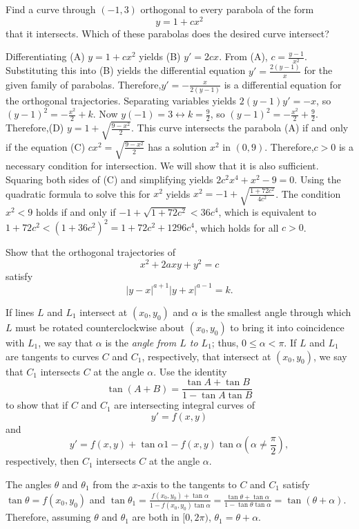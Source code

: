 \documentclass{ximera}
\begin{document}
\begin{problem}\label{exer:4.5.30}
Find a curve through $(-1,3)$ orthogonal to every parabola of the form
$$
y=1+cx^2
$$
that it intersects. Which of these parabolas does the desired curve
intersect?

\begin{solution}
Differentiating (A) $y=1+cx^2$ yields (B) $y'=2cx$. From (A),
$c=\frac{y-1}{x^2}$. Substituting this into (B) yields the
differential equation $y'=\frac{2(y-1)}{x}$ for the given family of
parabolas. Therefore,$y'=-\frac{x}{2(y-1)}$ is a differential
equation for the orthogonal trajectories. Separating variables yields
$2(y-1)y'=-x$, so $(y-1)^2=-\frac{x^2}{2}+k$. Now
$y(-1)=3\leftrightarrow k=\frac{9}{2}$, so
$(y-1)^2=-\frac{x^2}{2}+\frac{9}{2}$. Therefore,(D)
$y=1+\sqrt{\frac{9-x^2}{2}}$. This curve intersects the parabola
(A) if and only if the equation (C) $cx^2=\sqrt{\frac{9-x^2}{2}}$ has
a solution $x^2$ in $(0,9)$. Therefore,$c>0$ is a necessary condition for intersection. We will show that it is also sufficient. Squaring both sides of (C) and simplifying yields $2c^2x^4+x^2-9=0$. Using the quadratic formula to solve this for $x^2$ yields
$x^2=-1+\sqrt{\frac{1+72c^2}{4c^2}}$. The condition $x^2<9$ holds if
and only if $-1+\sqrt{1+72c^2}<36c^4$, which is equivalent to
$1+72c^2<(1+36c^2)^2=1+72c^2+1296c^4$, which holds for all $c>0$.
\end{solution}
\end{problem}

\begin{problem}\label{exer:4.5.31}
Show that the orthogonal trajectories of
$$
x^2+2axy+y^2=c
$$
satisfy
$$
|y-x|^{a+1}|y+x|^{a-1}=k.
$$
\end{problem}

\begin{problem}\label{exer:4.5.32}
If lines $L$ and $L_1$ intersect at $(x_0,y_0)$ and $\alpha$ is the
smallest angle through which $L$ must be rotated counterclockwise
about $(x_0,y_0)$ to bring it into coincidence with $L_1$, we say that
$\alpha$ is the \emph{angle from $L$ to $L_1$};   thus,
$0\le\alpha<\pi$. If $L$ and $L_1$ are tangents to curves $C$ and
$C_1$, respectively, that intersect at $(x_0,y_0)$, we say that $C_1$
intersects $C$ at the angle $\alpha$. Use the identity
$$
\tan(A+B)=\frac{\tan A+\tan B}{1-\tan A\tan B}
$$
to show that if $C$ and $C_1$ are intersecting integral curves of
$$
y'=f(x,y)$$
and
$$y'={f(x,y)+\tan\alpha}{
1-f(x,y)\tan\alpha} \left( \alpha \ne \frac{\pi}{2}\right),
$$
respectively, then $C_1$ intersects $C$ at the angle $\alpha$.

\begin{solution}
The angles $\theta$ and $\theta_1$  from the $x$-axis to the tangents
to $C$ and $C_1$ satisfy $\tan\theta=f(x_0,y_0)$ and
$\tan\theta_1=\frac{f(x_0,y_0)+\tan\alpha}{1-f(x_0,y_0)\tan\alpha}=
\frac{\tan\theta+\tan\alpha}{1-\tan\theta\tan\alpha}=\tan(\theta+\alpha)$.
Therefore, assuming $\theta$ and $\theta_1$ are both in $[0,2\pi)$,
$\theta_1=\theta+\alpha$.
\end{solution}
\end{problem}
\end{document}
